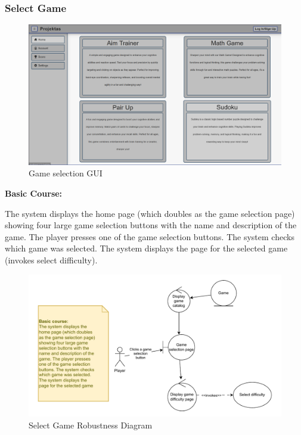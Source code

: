 \documentclass[11pt,a4paper]{article}
\newcommand{\heading}[1]{\vspace{1em}\noindent\textbf{#1}\par\vspace{0.5em}}
\begin{document}
\subsubsection{Select Game}

\begin{figure}[H]
    \centering
    \includegraphics[width=1\textwidth,keepaspectratio]{PSI_3rd_trial/PNGs/game_selection.png}
    \caption{Game selection GUI}
    \label{fig:game_selection}
\end{figure}

\heading{Basic Course:}
The system displays the home page (which doubles as the game selection page) showing four large game selection buttons with the name and description of the game. The player presses one of the game selection buttons. The system checks which game was selected. The system displays the page for the selected game (invokes select difficulty).

\begin{figure}[H]
    \centering
    \includegraphics[width=1\textwidth,keepaspectratio]{PSI_3rd_trial/robustness/game_selection_good_2.drawio.pdf}
    \caption{Select Game Robustness Diagram}
    \label{fig:game_selection_diagram}
\end{figure}
\end{document}
